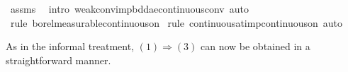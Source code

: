 \documentclass{article}
\theoremstyle{definition}
\begin{document}
\begin{isabellebody}
\isamarkupfalse%
\ assms\ \isamarkupfalse%
\ {\isacharparenleft}intro\ weak{\isacharunderscore}conv{\isacharunderscore}imp{\isacharunderscore}bdd{\isacharunderscore}ae{\isacharunderscore}continuous{\isacharunderscore}conv{\isacharcomma}\ auto{\isacharparenright}\isanewline
\ \ \isamarkupfalse%
\ {\isacharparenleft}rule\ borel{\isacharunderscore}measurable{\isacharunderscore}continuous{\isacharunderscore}on{}{\isacharparenright}\isanewline
{}\isamarkupfalse%
\ {\isacharparenleft}rule\ continuous{\isacharunderscore}at{\isacharunderscore}imp{\isacharunderscore}continuous{\isacharunderscore}on{\isacharcomma}\ auto{\isacharparenright}%
\end{isabellebody}

\medskip

As in the informal treatment, $(1) \Longrightarrow (3)$ can now be obtained in a straightforward manner.

\medskip
\end{document}

